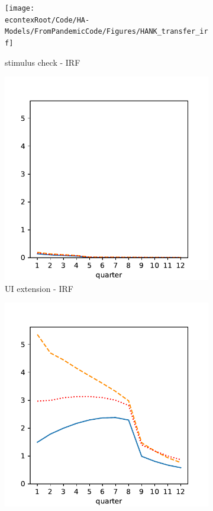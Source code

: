 \documentclass[\econtexRoot/HAFiscal]{subfiles}
\begin{document}
\begin{figure}[htb]
	\centering
	\begin{subfigure}[b]{.33\linewidth}
		\centering
		\texttt{[image: \\econtexRoot/Code/HA-Models/FromPandemicCode/Figures/HANK\_transfer\_irf]}
		\caption{stimulus check - IRF}
		\notinsubfile{\label{fig:hank_stimulus_irf}}
	\end{subfigure}%
	\begin{subfigure}[b]{.33\linewidth}
		\centering
		\includegraphics[width=\linewidth]{Code/HA-Models/FromPandemicCode/Figures/HANK_UI_irf}
		\caption{UI extension - IRF}
		\notinsubfile{\label{fig:hank_UI_irf}}
	\end{subfigure}%
	\begin{subfigure}[b]{.33\linewidth}
		\centering
		\includegraphics[width=\linewidth]{Code/HA-Models/FromPandemicCode/Figures/HANK_tax_irf}

\end{subfigure}
\end{figure}
\end{document}
